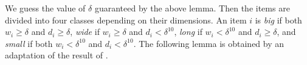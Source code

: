 We guess the value of $\delta$ guaranteed by the above lemma. Then the items are divided into four classes depending on their dimensions. An item $i$ is \emph{big} if both $w_i \ge \delta$ and $d_i \ge \delta$, \emph{wide} if $w_i \ge \delta$ and $d_i < \delta^{10}$, \emph{long} if $w_i < \delta^{10}$ and $d_i \ge \delta$, and \emph{small} if both $w_i < \delta^{10}$ and $d_i < \delta^{10}$. The following lemma is obtained by an adaptation of the result of \cite{3d-strip-packing}.

